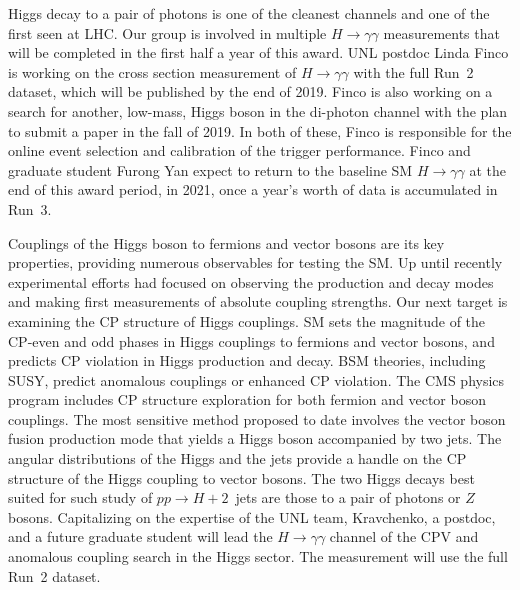 Higgs decay to a pair of photons is one of the cleanest channels and one of the first seen at LHC. Our group is involved in multiple $H\to\gamma\gamma$ measurements that will be completed in the first half a year of this award. UNL postdoc Linda Finco is working on the cross section measurement of  $H\to\gamma\gamma$ with the full Run~2 dataset, which will be published by the end of 2019. Finco is also working on a search for another, low-mass, Higgs boson in the di-photon channel with the plan to submit a paper in the fall of 2019. In both of these, Finco is responsible for the online event selection and calibration of the trigger performance. Finco and graduate student Furong Yan expect to return to the baseline SM $H\to\gamma\gamma$ at the end of this award period, in 2021, once a year's worth of data is accumulated in Run~3.

Couplings of the Higgs boson to fermions and vector bosons are its key properties, providing numerous observables for testing the SM.  Up until recently experimental efforts had focused on observing the production and decay modes and making first measurements of absolute coupling strengths. Our next target is examining the CP structure of Higgs couplings. SM sets the magnitude of the CP-even and odd phases in Higgs couplings to fermions and vector bosons, and predicts CP violation in Higgs production and decay. BSM theories, including SUSY, predict anomalous couplings or enhanced CP violation. The CMS physics program includes CP structure exploration for both fermion and vector boson couplings. The most sensitive method proposed to date involves the vector boson fusion production mode that yields a Higgs boson accompanied by two jets. The angular distributions of the Higgs and the jets provide a handle on the CP structure of the Higgs coupling to vector bosons. The two Higgs decays best suited for such study of $pp\to H+2$~jets are those to a pair of photons or $Z$ bosons. Capitalizing on the expertise of the UNL team, Kravchenko, a postdoc, and a future graduate student will lead the $H\to\gamma\gamma$ channel of the CPV and anomalous coupling search in the Higgs sector. The measurement will use the full Run~2 dataset.

